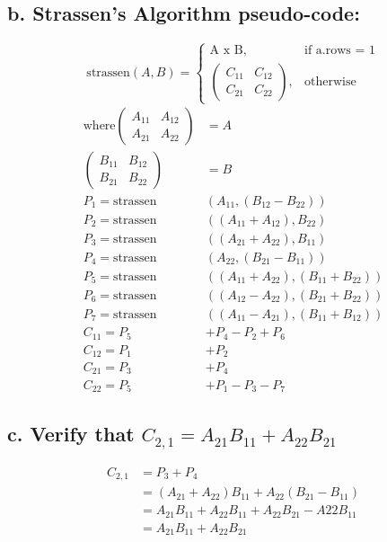 \documentclass{article}
\begin{document}
    \subsection*{b. Strassen's Algorithm pseudo-code:}
    \[
        \text{strassen}(A, B) = 
        \begin{cases}
            \text{A x B}, & \text{if a.rows = 1} \\
            \begin{pmatrix}
                C_{11} & C_{12} \\
                C_{21} & C_{22}
            \end{pmatrix}, & \text{otherwise }
        \end{cases}
    \]
    \begin{align*}
        \text{where}
        \begin{pmatrix}
            A_{11} & A_{12} \\
            A_{21} & A_{22}
        \end{pmatrix}
        &= A \\
        \begin{pmatrix}
            B_{11} & B_{12} \\
            B_{21} & B_{22}
        \end{pmatrix}
        &= B \\
        P_1 = \text{strassen}&(A_{11}, (B_{12} - B_{22})) \\
        P_2 = \text{strassen}&((A_{11} + A_{12}), B_{22}) \\
        P_3 = \text{strassen}&((A_{21} + A_{22}), B_{11}) \\
        P_4 = \text{strassen}&(A_{22}, (B_{21} - B_{11})) \\
        P_5 = \text{strassen}&((A_{11} + A_{22}), (B_{11} + B_{22})) \\
        P_6 = \text{strassen}&((A_{12} - A_{22}), (B_{21} + B_{22})) \\
        P_7 = \text{strassen}&((A_{11} - A_{21}), (B_{11} + B_{12})) \\
        C_{11} = P_5 &+ P_4 - P_2 + P_6 \\
        C_{12} = P_1 &+ P_2 \\
        C_{21} = P_3 &+ P_4 \\
        C_{22} = P_5 &+ P_1 - P_3 - P_7
    \end{align*}
    \subsection*{c. Verify that \(C_{2,1} = A_{21}B_{11} + A_{22}B_{21}\)}
    \begin{align*}
        C_{2,1} &= P_3 + P_4 \\
        &= (A_{21} + A_{22})B_{11} + A_{22}(B_{21} - B_{11})\\
        &= A_{21}B_{11} + A_{22}B_{11} + A_{22}B_{21} - A{22}B_{11} \\
        &= A_{21}B_{11} + A_{22}B_{21}
    \end{align*}
\end{document}
